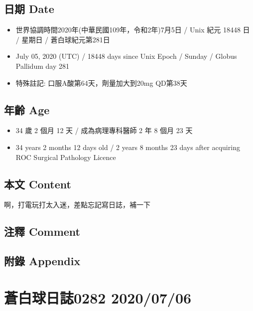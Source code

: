 \documentclass[
]{article}
\providecommand{\tightlist}{%
  \setlength{\itemsep}{0pt}\setlength{\parskip}{0pt}}
\begin{document}
\hypertarget{ux65e5ux671f-date-4}{%
\subsection{日期 Date}\label{ux65e5ux671f-date-4}}

\begin{itemize}
\tightlist
\item
  世界協調時間2020年(中華民國109年，令和2年)7月5日 / Unix 紀元 18448 日
  / 星期日 / 蒼白球紀元第281日
\item
  July 05, 2020 (UTC) / 18448 days since Unix Epoch / Sunday / Globus
  Pallidum day 281
\item
  特殊註記: 口服A酸第64天，劑量加大到20mg QD第38天
\end{itemize}

\hypertarget{ux5e74ux9f61-age-4}{%
\subsection{年齡 Age}\label{ux5e74ux9f61-age-4}}

\begin{itemize}
\tightlist
\item
  34 歲 2 個月 12 天 / 成為病理專科醫師 2 年 8 個月 23 天
\item
  34 years 2 months 12 days old / 2 years 8 months 23 days after
  acquiring ROC Surgical Pathology Licence
\end{itemize}

\hypertarget{ux672cux6587-content-4}{%
\subsection{本文 Content}\label{ux672cux6587-content-4}}

啊，打電玩打太入迷，差點忘記寫日誌，補一下

\hypertarget{ux6ce8ux91cb-comment-4}{%
\subsection{注釋 Comment}\label{ux6ce8ux91cb-comment-4}}

\hypertarget{ux9644ux9304-appendix-4}{%
\subsection{附錄 Appendix}\label{ux9644ux9304-appendix-4}}

\hypertarget{ux84bcux767dux7403ux65e5ux8a8c0282-20200706}{%
\section{蒼白球日誌0282
2020/07/06}\label{ux84bcux767dux7403ux65e5ux8a8c0282-20200706}}
\end{document}
